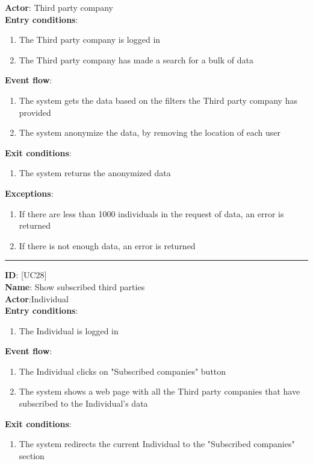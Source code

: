 \documentclass[hidelinks, 12pt]{report}
\newcommand\usecase[1]{ [UC#1] }
\begin{document}
\begin{itemize}
		\textbf{Actor}: Third party company \\
		\textbf{Entry conditions}:
		\begin{enumerate}
			\item{The Third party company is logged in}
			\item{The Third party company has made a search for a bulk of data}
		\end{enumerate}
		\textbf{Event flow}:
		\begin{enumerate}
			\item{The system gets the data based on the filters the Third party company has provided}
			\item{The system anonymize the data, by removing the location of each user}
		\end{enumerate}
		\textbf{Exit conditions}:
		\begin{enumerate}
			\item{The system returns the anonymized data}
		\end{enumerate}
		\textbf{Exceptions}:
		\begin{enumerate}
			\item{If there are less than 1000 individuals in the request of data, an error is returned}
			\item{If there is not enough data, an error is returned}
  		\end{enumerate}
		\rule{\linewidth}{0.4pt}
		\textbf{ID}: \usecase{28} \\
		\textbf{Name}: Show subscribed third parties \\
		\textbf{Actor}:Individual \\
		\textbf{Entry conditions}:
    		\begin{enumerate}
			\item{The Individual is logged in}
  		\end{enumerate}
		\textbf{Event flow}:
  		\begin{enumerate}
			\item{The Individual clicks on "Subscribed companies" button}
			\item{The system shows a web page with all the Third party companies that have subscribed to the Individual's data}
		\end{enumerate}
		\textbf{Exit conditions}:
		\begin{enumerate}
			\item{The system redirects the current Individual to the "Subscribed companies" section}
		\end{enumerate}

\end{itemize}
\end{document}
